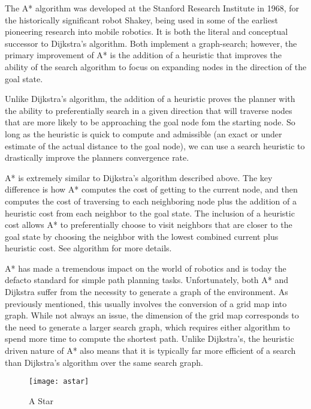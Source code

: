 The A* algorithm was developed at the Stanford Research Institute in 1968, for the historically significant robot Shakey, being used in some of the earliest pioneering research into mobile robotics. It is both the literal and conceptual successor to Dijkstra's algorithm. Both implement a graph-search; however, the primary improvement of A* is the addition of a heuristic that improves the ability of the search algorithm to focus on expanding nodes in the direction of the goal state.  

Unlike Dijkstra's algorithm, the addition of a heuristic proves the planner with the ability to preferentially search in a given direction that will traverse nodes that are more likely to be approaching the goal node fom the starting node. So long as the heuristic is quick to compute and admissible (an exact or under estimate of the actual distance to the goal node), we can use a search heuristic to drastically improve the planners convergence rate.

A* is extremely similar to Dijkstra's algorithm described above. The key difference is how A* computes the cost of getting to the current node, and then computes the cost of traversing to each neighboring node plus the addition of a heuristic cost from each neighbor to the goal state. The inclusion of a heuristic cost allows A* to preferentially choose to visit neighbors that are closer to the goal state by choosing the neighbor with the lowest combined current plus heuristic cost. See algorithm for more details.



A* has made a tremendous impact on the world of robotics and is today the defacto standard for simple path planning tasks. Unfortunately, both A* and Dijkstra suffer from the necessity to generate a graph of the environment. As previously mentioned, this usually involves the conversion of a grid map into graph. While not always an issue, the dimension of the grid map corresponds to the need to generate a larger search graph, which requires either algorithm to spend more time to compute the shortest path. Unlike Dijkstra's, the heuristic driven nature of A* also means that it is typically far more efficient of a search than Dijkstra's algorithm over the same search graph. 


\begin{figure}[h!]
    \texttt{[image: astar]}
    \centering
    \label{fig:Astar}
    \caption{A Star}
  \end{figure}

